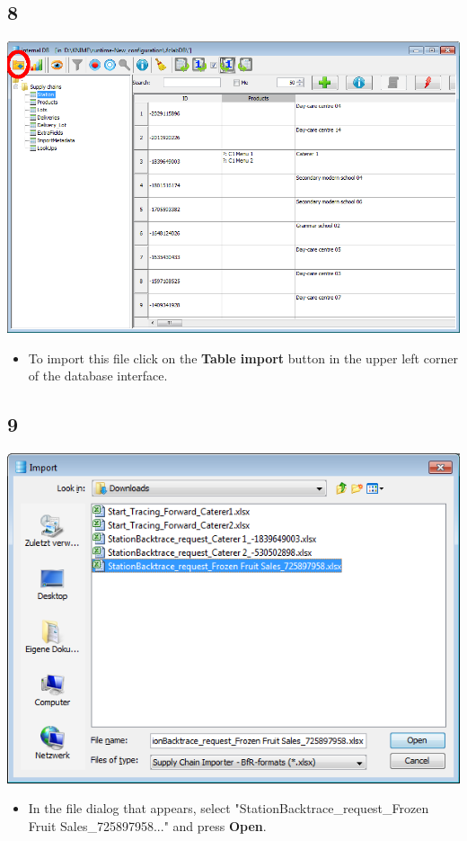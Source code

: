 \documentclass{beamer}
\begin{document}
\subsection{8}
\begin{frame}
	\begin{center}
  		\includegraphics[height=0.6\textheight]{8.png}
	\end{center}
	\begin{itemize}
		\item To import this file click on the \textbf{Table import} button in the upper left corner of the database interface.
	\end{itemize}
\end{frame}

\subsection{9}
\begin{frame}
	\begin{center}
  		\includegraphics[height=0.6\textheight]{9.png}
	\end{center}
	\begin{itemize}
		\item In the file dialog that appears, select "StationBacktrace\_request\_Frozen Fruit Sales\_725897958..." and press \textbf{Open}.
	\end{itemize}
\end{frame}
\end{document}
